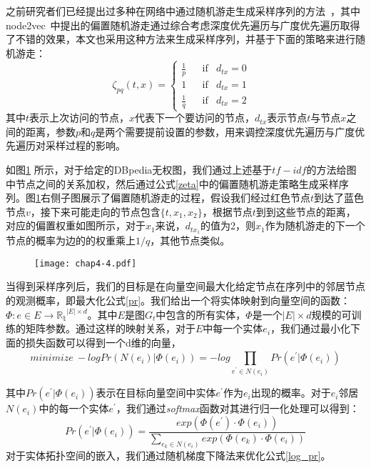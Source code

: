 \noindent 之前研究者们已经提出过多种在网络中通过随机游走生成采样序列的方法~\cite{kdd/Perozzi14, kdd/GroverL16}，其中node2vec~\cite{kdd/GroverL16}中提出的偏置随机游走通过综合考虑深度优先遍历与广度优先遍历取得了不错的效果，本文也采用这种方法来生成采样序列，并基于下面的策略来进行随机游走：
\begin{equation}
    \label{zeta}
    \zeta_{pq}(t,x) = \left\{\begin{matrix}
        \frac{1}{p} && \text{if} & d_{tx} = 0 & \\
        1           && \text{if} & d_{tx} = 1 & \\
        \frac{1}{q} && \text{if} & d_{tx} = 2 & 
        \end{matrix}\right.
\end{equation} 
\noindent 其中$t$表示上次访问的节点，$x$代表下一个要访问的节点，$d_{tx}$表示节点$t$与节点$x$之间的距离，参数$p$和$q$是两个需要提前设置的参数，用来调控深度优先遍历与广度优先遍历对采样过程的影响。

如图\ref{chap4-4} 所示，对于给定的DBpedia无权图，我们通过上述基于$tf-idf$的方法给图中节点之间的关系加权，然后通过公式\ref{zeta}中的偏置随机游走策略生成采样序列。图\ref{chap4-4}右侧子图展示了偏置随机游走的过程，假设我们经过红色节点$t$到达了蓝色节点$v$，接下来可能走向的节点包含$\{t, x_1, x_2\}$，根据节点$t$到到这些节点的距离，对应的偏置权重如图所示，对于$x_1$来说，$d_{tx_1}$的值为2，则$x_1$作为随机游走的下一个节点的概率为边的的权重乘上$1/q$，其他节点类似。

\begin{figure}[!ht]
    \centerline{\texttt{[image: chap4-4.pdf]}}
    \label{chap4-4}
\end{figure}

当得到采样序列后，我们的目标是在向量空间最大化给定节点在序列中的邻居节点的观测概率，即最大化公式\ref{pr}。我们给出一个将实体映射到向量空间的函数：$\Phi: e \in E \rightarrow \mathbb{R_t}^{\left | E \right | \times d}$。其中$E$是图$G_t$中包含的所有实体，$\Phi$是一个$\left | E \right | \times d$规模的可训练的矩阵参数。通过这样的映射关系，对于$E$中每一个实体$e_i$，我们通过最小化下面的损失函数可以得到一个d维的向量，
\begin{equation}
    \label{log_pr}
    minimize\ -log Pr(N(e_i)|\Phi(e_i)) = -log\prod_{e^{'} \in N(e_i)}^{ }Pr(e^{'}|\Phi(e_i))
\end{equation}

\noindent 其中$Pr(e^{'}|\Phi(e_i))$表示在目标向量空间中实体$e^{'}$作为$e_i$出现的概率。对于$e_i$邻居$N(e_i)$中的每一个实体$e^{'}$，我们通过\emph{softmax}函数对其进行归一化处理可以得到：
\begin{equation}
    Pr(e^{'}|\Phi(e_i)) = \frac{exp(\Phi(e^{'})\cdot \Phi(e_i))}{\sum_{e_k \in N(e_i)}^{ }exp(\Phi(e_k)\cdot \Phi(e_i))}
\end{equation}
\noindent 对于实体拓扑空间的嵌入，我们通过随机梯度下降法来优化公式\ref{log_pr}。

